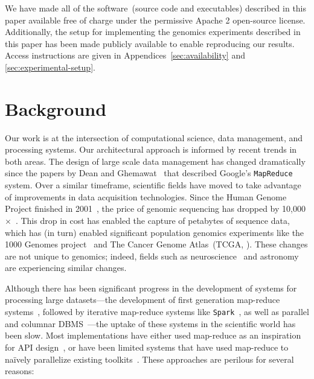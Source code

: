 \documentclass{sig-alternate}
\begin{document}
We have made all of the software~(source code and executables) described in this paper available free
of charge under the permissive Apache 2 open-source license. Additionally, the setup for implementing the
genomics experiments described in this paper has been made publicly available to enable reproducing our
results. Access instructions are given in Appendices~\ref{sec:availability} and \ref{sec:experimental-setup}.

\section{Background}
\label{sec:background}

Our work is at the intersection of computational science, data management, and processing
systems. Our architectural approach is informed by recent trends in both areas. The design of
large scale data management has changed dramatically since the papers by Dean and
Ghemawat~\cite{dean04, dean08} that described Google's \texttt{MapReduce} system. Over a
similar timeframe, scientific fields have moved to take advantage of improvements in data acquisition
technologies. Since the Human Genome Project finished in 2001~\cite{lander01}, the price
of genomic sequencing has dropped by 10,000$\times$~\cite{nhgri}. This drop in cost has enabled the
capture of petabytes of sequence data, which has (in turn) enabled significant population genomics
experiments like the 1000 Genomes project~\cite{siva08} and The Cancer Genome Atlas~(TCGA,
\cite{weinstein13}). These changes are not unique to genomics; indeed, fields such as
neuroscience~\cite{cunningham14} and astronomy~\cite{lsst2008, turk11, sdss2000} are experiencing similar
changes.

Although there has been significant progress in the development of systems for processing large
datasets---the development of first generation map-reduce systems~\cite{dean04}, followed by
iterative map-reduce systems like \texttt{Spark}~\cite{zaharia10}, as well as parallel and columnar
DBMS~\cite{abadi06, lamb12}---the uptake of these systems in the scientific world has been slow.
Most implementations have either used map-reduce as an inspiration for API
design~\cite{mckenna10}, or have been limited systems that have used map-reduce to na\"{i}vely
parallelize existing toolkits~\cite{langmead09, schatz09}. These approaches are perilous for several
reasons:
\end{document}
